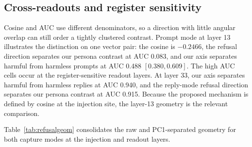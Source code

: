 \subsection{Cross-readouts and register sensitivity}

Cosine and AUC use different denominators, so a direction with little angular
overlap can still order a tightly clustered contrast. Prompt mode at layer 13
illustrates the distinction on one vector pair: the cosine is $-0.2466$, the
refusal direction separates our persona contrast at AUC 0.083, and our axis
separates harmful from harmless prompts at AUC 0.488 $[0.380, 0.609]$. The high
AUC cells occur at the register-sensitive readout layers. At layer 33, our axis
separates harmful from harmless replies at AUC 0.940, and the reply-mode refusal
direction separates our persona contrast at AUC 0.915. Because the proposed
mechanism is defined by cosine at the injection site, the layer-13 geometry is
the relevant comparison.

Table~\ref{tab:refusalgeom} consolidates the raw and PC1-separated geometry for
both capture modes at the injection and readout layers.

